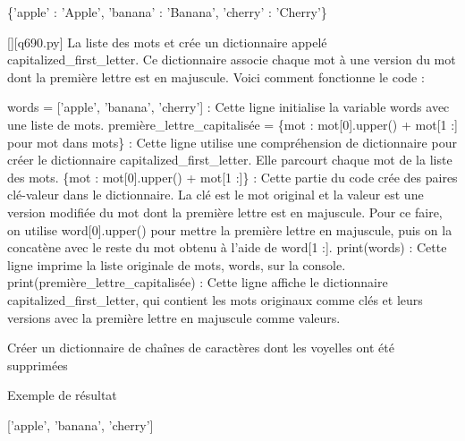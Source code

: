 \{'apple' : 'Apple', 'banana' : 'Banana', 'cherry' : 'Cherry'\}
        \par
        \begin{solution}
            \renewcommand{\nomfichier}{q690.py}
            \pythonfile{\chemincode \nomfichier}[][\nomfichier]
            La liste des mots et crée un dictionnaire appelé capitalized\_first\_letter. Ce dictionnaire associe chaque mot à une version du mot dont la première lettre est en majuscule. Voici comment fonctionne le code :

    words = ['apple', 'banana', 'cherry'] : Cette ligne initialise la variable words avec une liste de mots.
    première\_lettre\_capitalisée = \{mot : mot[0].upper() + mot[1 :] pour mot dans mots\} : Cette ligne utilise une compréhension de dictionnaire pour créer le dictionnaire capitalized\_first\_letter. Elle parcourt chaque mot de la liste des mots.
        \{mot : mot[0].upper() + mot[1 :]\} : Cette partie du code crée des paires clé-valeur dans le dictionnaire. La clé est le mot original et la valeur est une version modifiée du mot dont la première lettre est en majuscule. Pour ce faire, on utilise word[0].upper() pour mettre la première lettre en majuscule, puis on la concatène avec le reste du mot obtenu à l'aide de word[1 :].
    print(words) : Cette ligne imprime la liste originale de mots, words, sur la console.
    print(première\_lettre\_capitalisée) : Cette ligne affiche le dictionnaire capitalized\_first\_letter, qui contient les mots originaux comme clés et leurs versions avec la première lettre en majuscule comme valeurs.
        \end{solution}
        

        \question
        Créer un dictionnaire de chaînes de caractères dont les voyelles ont été supprimées

Exemple de résultat

['apple', 'banana', 'cherry']

